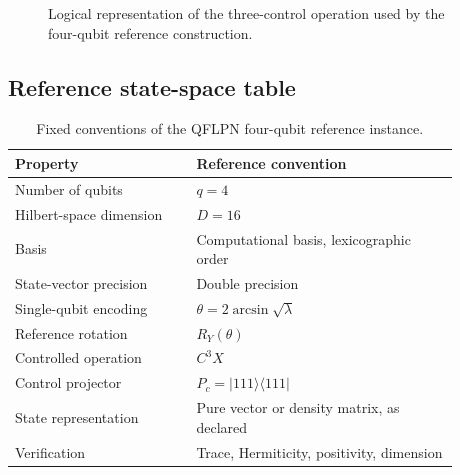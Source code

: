 \documentclass[final,3p,times]{elsarticle}
\begin{document}
\begin{figure}[tbp]
    \centering
{}
    \caption{Logical representation of the three-control operation used by the four-qubit reference construction.}
    \label{fig:c3x}
\end{figure}

\subsection{Reference state-space table}

\begin{table}[tbp]
    \centering
    \caption{Fixed conventions of the QFLPN four-qubit reference instance.}
    \label{tab:4q-conventions}
\begin{tabular}{p{0.36\linewidth} p{0.52\linewidth}}
        \toprule
        Property                & Reference convention                       \\
        \midrule
        Number of qubits        & $q=4$                                      \\
        Hilbert-space dimension & $D=16$                                     \\
        Basis                   & Computational basis, lexicographic order   \\
        State-vector precision  & Double precision                           \\
        Single-qubit encoding   & $\theta=2\arcsin\sqrt{\lambda}$            \\
        Reference rotation      & $R_Y(\theta)$                              \\
        Controlled operation    & $C^3X$                                     \\
        Control projector       & $P_c=|111\rangle\langle111|$               \\
        State representation    & Pure vector or density matrix, as declared \\
        Verification            & Trace, Hermiticity, positivity, dimension  \\
        \bottomrule
\end{tabular}
\end{table}
\end{document}
